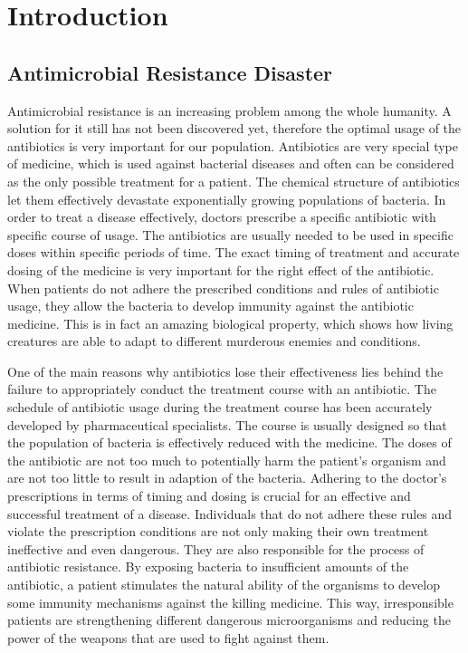 \chapter*{Introduction}


\section{Antimicrobial Resistance Disaster}

Antimicrobial resistance is an increasing problem among the whole humanity. A solution for it still has not been discovered yet, therefore the optimal usage of the antibiotics is very important for our population. Antibiotics are very special type of medicine, which is used against bacterial diseases and often can be considered as the only possible treatment for a patient. The chemical structure of antibiotics let them effectively devastate exponentially growing populations of bacteria. In order to treat a disease effectively, doctors prescribe a specific antibiotic with specific course of usage. The antibiotics are usually needed to be used in specific doses within specific periods of time. The exact timing of treatment and accurate dosing of the medicine is very important for the right effect of the antibiotic. When patients do not adhere the prescribed conditions and rules of antibiotic usage, they allow the bacteria to develop immunity against the antibiotic medicine. This is in fact an amazing biological property, which shows how living creatures are able to adapt to different murderous enemies and conditions.

One of the main reasons why antibiotics lose their effectiveness lies behind the failure to appropriately conduct the treatment course with an antibiotic. The schedule of antibiotic usage during the treatment course has been accurately developed by pharmaceutical specialists. The course is usually designed so that the population of bacteria is effectively reduced with the medicine. The doses of the antibiotic are not too much to potentially harm the patient's organism and are not too little to result in adaption of the bacteria. Adhering to the doctor's prescriptions in terms of timing and dosing is crucial for an effective and successful treatment of a disease. Individuals that do not adhere these rules and violate the prescription conditions are not only making their own treatment ineffective and even dangerous. They are also responsible for the process of antibiotic resistance. By exposing bacteria to insufficient amounts of the antibiotic, a patient stimulates the natural ability of the organisms to develop some immunity mechanisms against the killing medicine. This way, irresponsible patients are strengthening different dangerous microorganisms and reducing the power of the weapons that are used to fight against them.


